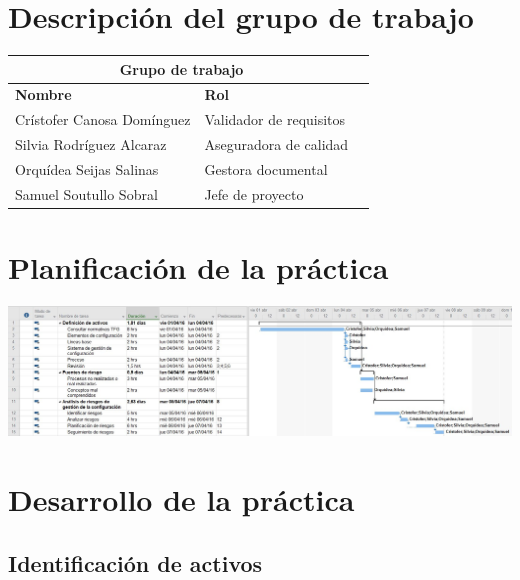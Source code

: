 \documentclass[10pt,a4paper]{article}
\begin{document}
	\section{Descripción del grupo de trabajo}
		\begin{table}[htb]
        \centering
        \begin{tabular}{|l|l|l|}
        \hline
        \multicolumn{2}{|c|}{\textbf{Grupo de trabajo}} \\ \hline
       \textbf{Nombre} & \textbf{Rol}\\
        \hline \hline
        Crístofer Canosa Domínguez & Validador de requisitos \\ \hline
        Silvia Rodríguez Alcaraz & Aseguradora de calidad \\ \hline
        Orquídea Seijas Salinas & Gestora documental \\ \hline
        Samuel Soutullo Sobral & Jefe de proyecto \\ \hline
        \end{tabular}   
        \end{table}
		
	\section{Planificación de la práctica}
		\includegraphics[scale=0.25]{imagenes/planificacion.jpg}
		
	\section{Desarrollo de la práctica}
		\subsection{Identificación de activos}
\end{document}
